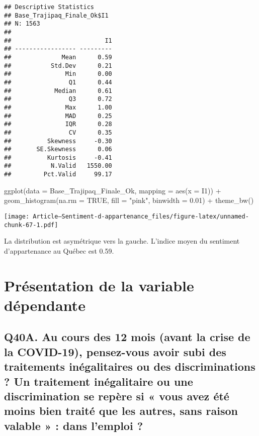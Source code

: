\documentclass[
]{article}
\newenvironment{Shaded}{\begin{snugshade}}{\end{snugshade}}
\newcommand{\AttributeTok}[1]{\textcolor[rgb]{0.77,0.63,0.00}{#1}}
\newcommand{\ConstantTok}[1]{\textcolor[rgb]{0.00,0.00,0.00}{#1}}
\newcommand{\FloatTok}[1]{\textcolor[rgb]{0.00,0.00,0.81}{#1}}
\newcommand{\FunctionTok}[1]{\textcolor[rgb]{0.00,0.00,0.00}{#1}}
\newcommand{\NormalTok}[1]{#1}
\newcommand{\SpecialCharTok}[1]{\textcolor[rgb]{0.00,0.00,0.00}{#1}}
\newcommand{\StringTok}[1]{\textcolor[rgb]{0.31,0.60,0.02}{#1}}
\begin{document}
\begin{verbatim}
## Descriptive Statistics  
## Base_Trajipaq_Finale_Ok$I1  
## N: 1563  
## 
##                          I1
## ----------------- ---------
##              Mean      0.59
##           Std.Dev      0.21
##               Min      0.00
##                Q1      0.44
##            Median      0.61
##                Q3      0.72
##               Max      1.00
##               MAD      0.25
##               IQR      0.28
##                CV      0.35
##          Skewness     -0.30
##       SE.Skewness      0.06
##          Kurtosis     -0.41
##           N.Valid   1550.00
##         Pct.Valid     99.17
\end{verbatim}

\begin{Shaded}
\begin{Highlighting}[]
\FunctionTok{ggplot}\NormalTok{(}\AttributeTok{data =}\NormalTok{ Base\_Trajipaq\_Finale\_Ok, }\AttributeTok{mapping =} \FunctionTok{aes}\NormalTok{(}\AttributeTok{x =}\NormalTok{ I1)) }\SpecialCharTok{+}
  \FunctionTok{geom\_histogram}\NormalTok{(}\AttributeTok{na.rm =} \ConstantTok{TRUE}\NormalTok{, }\AttributeTok{fill =} \StringTok{"pink"}\NormalTok{, }\AttributeTok{binwidth =} \FloatTok{0.01}\NormalTok{) }\SpecialCharTok{+}
  \FunctionTok{theme\_bw}\NormalTok{()}
\end{Highlighting}
\end{Shaded}

\texttt{[image: Article---Sentiment-d-appartenance\_files/figure-latex/unnamed-chunk-67-1.pdf]}

La distribution est asymétrique vers la gauche. L'indice moyen du
sentiment d'appartenance au Québec est 0.59.

\hypertarget{pruxe9sentation-de-la-variable-duxe9pendante}{%
\section{Présentation de la variable
dépendante}\label{pruxe9sentation-de-la-variable-duxe9pendante}}

\hypertarget{q40a.-au-cours-des-12-mois-avant-la-crise-de-la-covid-19-pensez-vous-avoir-subi-des-traitements-inuxe9galitaires-ou-des-discriminations-un-traitement-inuxe9galitaire-ou-une-discrimination-se-repuxe8re-si-vous-avez-uxe9tuxe9-moins-bien-traituxe9-que-les-autres-sans-raison-valable-dans-lemploi}{%
\subsection{Q40A. Au cours des 12 mois (avant la crise de la COVID-19),
pensez-vous avoir subi des traitements inégalitaires ou des
discriminations ? Un traitement inégalitaire ou une discrimination se
repère si « vous avez été moins bien traité que les autres, sans raison
valable » : dans l'emploi
?}\label{q40a.-au-cours-des-12-mois-avant-la-crise-de-la-covid-19-pensez-vous-avoir-subi-des-traitements-inuxe9galitaires-ou-des-discriminations-un-traitement-inuxe9galitaire-ou-une-discrimination-se-repuxe8re-si-vous-avez-uxe9tuxe9-moins-bien-traituxe9-que-les-autres-sans-raison-valable-dans-lemploi}}
\end{document}
